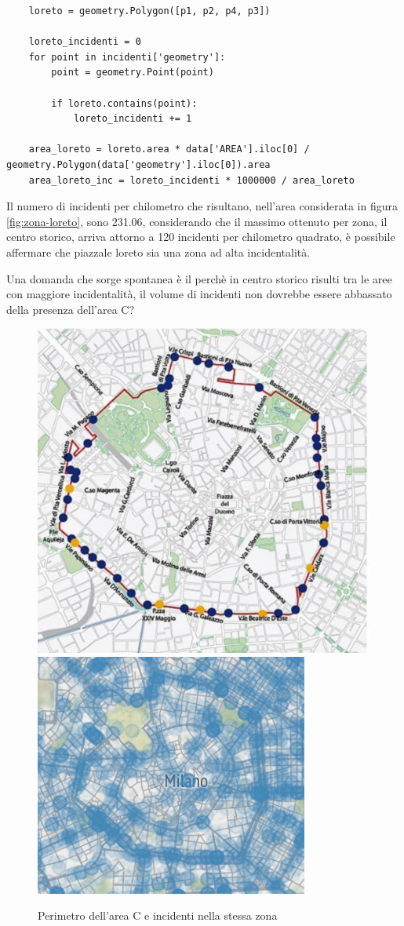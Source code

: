 \documentclass[a4paper]{report}
\begin{document}
\begin{lstlisting}
    loreto = geometry.Polygon([p1, p2, p4, p3])

    loreto_incidenti = 0
    for point in incidenti['geometry']: 
        point = geometry.Point(point)

        if loreto.contains(point): 
            loreto_incidenti += 1

    area_loreto = loreto.area * data['AREA'].iloc[0] / geometry.Polygon(data['geometry'].iloc[0]).area
    area_loreto_inc = loreto_incidenti * 1000000 / area_loreto
\end{lstlisting}

Il numero di incidenti per chilometro che risultano, nell'area considerata in figura 
\ref{fig:zona-loreto}, sono 231.06, considerando che il massimo ottenuto per zona, 
il centro storico, arriva attorno a 120 incidenti per chilometro quadrato, è possibile affermare 
che piazzale loreto sia una zona ad alta incidentalità.

Una domanda che sorge spontanea è il perchè in centro storico risulti tra le aree con maggiore 
incidentalità, il volume di incidenti non dovrebbe essere abbassato della presenza dell'area C?

\begin{figure}
    \includegraphics[width=0.48\linewidth]{../dataset/area_c/perimetro_area_c.png}
    \includegraphics[width=0.52\linewidth]{../src/area_c/area_c_incidenti.png}
    \caption{Perimetro dell'area C e incidenti nella stessa zona}
    \label{fig:perimetro-area-c}
\end{figure}
\end{document}
